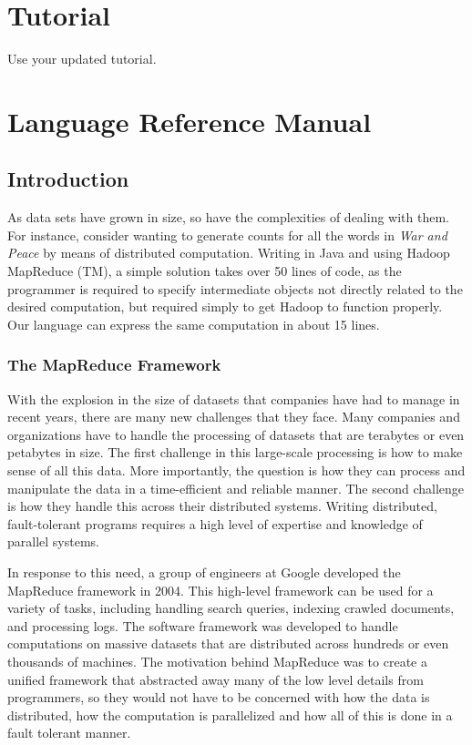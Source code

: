\documentclass{book}
\begin{document}
\chapter{Tutorial}
\label{chap:tutor}

Use your updated tutorial.

\chapter{Language Reference Manual}
\label{chap:LRM}

\section{Introduction}
\label{sec:introduction}

As data sets have grown in size, so have the complexities of dealing with them.
For instance, consider wanting to generate counts for all the words in \emph{War
and Peace} by means of distributed computation. Writing in Java and using Hadoop
MapReduce (TM), a simple solution takes over 50 lines of code, as the programmer
is required to specify intermediate objects not directly related to the desired
computation, but required simply to get Hadoop to function properly. Our language 
can express the same computation in about 15 lines.

\subsection{The MapReduce Framework}
\label{sub:mapreduce}

With the explosion in the size of datasets that companies have had to manage in
recent years, there are many new challenges that they face. Many companies and
organizations have to handle the processing of datasets that are terabytes or even
petabytes in size. The first challenge in this large-scale processing is how to
make sense of all this data. More importantly, the question is how they can 
process and manipulate the data in a time-efficient and reliable manner. 
The second challenge is how they handle this across their distributed systems. Writing distributed, fault-tolerant programs requires a high level of expertise and knowledge of parallel systems.

In response to this need, a group of engineers at Google developed the MapReduce
framework in 2004. This high-level framework can be used for a variety of
tasks, including handling search queries, indexing crawled documents, and
processing logs. The software framework was developed to handle computations on
massive datasets that are distributed across hundreds or even thousands of
machines. The motivation behind MapReduce was to create a unified framework that
abstracted away many of the low level details from programmers, so they would not
have to be concerned with how the data is distributed, how the computation is
parallelized and how all of this is done in a fault tolerant manner.
\end{document}
